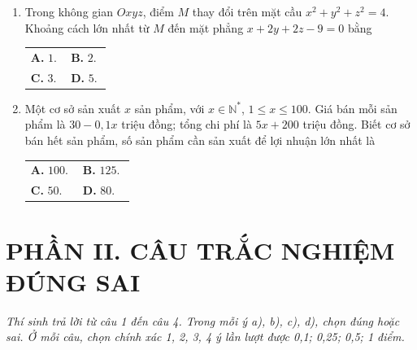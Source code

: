 \documentclass[12pt,a4paper]{article}
\makeatletter
\newcommand{\bonpa}[4]{\par\smallskip\noindent
\begin{tabular}{@{}p{0.47\linewidth}p{0.47\linewidth}@{}}
\textbf{A.} #1 & \textbf{B.} #2\\[3pt]
\textbf{C.} #3 & \textbf{D.} #4\end{tabular}}
\makeatother
\begin{document}
\begin{enumerate}
\bonpa{$\dfrac6{\sqrt5}$.}{$\dfrac{12}{\sqrt5}$.}{$12$.}{$6\sqrt5$.}
\item Trong không gian $Oxyz$, điểm $M$ thay đổi trên mặt cầu $x^2+y^2+z^2=4$. Khoảng cách lớn nhất từ $M$ đến mặt phẳng $x+2y+2z-9=0$ bằng
\bonpa{$1$.}{$2$.}{$3$.}{$5$.}
\item Một cơ sở sản xuất $x$ sản phẩm, với $x\in\mathbb N^*$, $1\leq x\leq100$. Giá bán mỗi sản phẩm là $30-0{,}1x$ triệu đồng; tổng chi phí là $5x+200$ triệu đồng. Biết cơ sở bán hết sản phẩm, số sản phẩm cần sản xuất để lợi nhuận lớn nhất là
\bonpa{$100$.}{$125$.}{$50$.}{$80$.}
\end{enumerate}

\newpage
\section*{\large PHẦN II. CÂU TRẮC NGHIỆM ĐÚNG SAI}
\textit{Thí sinh trả lời từ câu 1 đến câu 4. Trong mỗi ý a), b), c), d), chọn đúng hoặc sai. Ở mỗi câu, chọn chính xác 1, 2, 3, 4 ý lần lượt được 0,1; 0,25; 0,5; 1 điểm.}
\end{document}
